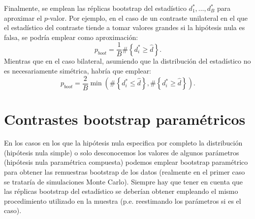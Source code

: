 \documentclass[
]{book}
\theoremstyle{break}
\theoremstyle{nonumberplain}
\begin{document}
Finalmente, se emplean las réplicas bootstrap
del estadístico \(d_1^{\ast},\ldots, d_B^{\ast}\) para aproximar el \(p\)-valor.
Por ejemplo, en el caso de un contraste unilateral en el que el estadístico del
contraste tiende a tomar valores grandes si la hipótesis nula es falsa,
se podría emplear como aproximación:
\[p_{boot} = \frac{1}{B}\#\left\{ d_i^{\ast} \geq \hat{d} \right\}.\]
Mientras que en el caso bilateral, asumiendo que la distribución del estadístico
no es necesariamente simétrica, habría que emplear:
\[p_{boot} = \frac{2}{B} \min \left(\#\left\{ d_i^{\ast} \leq \hat{d} \right\},
\#\left\{ d_i^{\ast} \geq \hat{d} \right\}\right).\]

\section{Contrastes bootstrap paramétricos}\label{contrastes-parametricos}

En los casos en los que la hipótesis nula especifica por completo la distribución
(hipótesis nula simple) o solo desconocemos los valores de algunos parámetros
(hipótesis nula paramétrica compuesta) podemos emplear
bootstrap paramétrico para obtener las remuestras bootstrap de los datos
(realmente en el primer caso se trataría de simulaciones Monte Carlo).
Siempre hay que tener en cuenta que las réplicas bootstrap del estadístico se
deberían obtener empleando el mismo procedimiento utilizado en la muestra
(p.e. reestimando los parámetros si es el caso).
\end{document}
